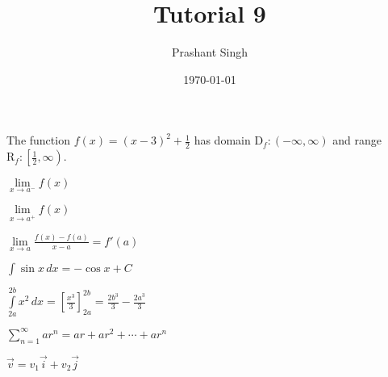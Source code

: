 \documentclass[12pt]{article}
\begin{document}
	\title{Tutorial 9}
	\author{Prashant Singh}
	\date{\today}
	\maketitle
	
The function $f(x) = (x-3)^2 + \frac{1}{2}$ has domain  $\mathrm{D}_f:(-\infty, \infty)$ and range $\mathrm{R}_f:\left[\frac{1}{2}, \infty \right)$.

$\lim \limits_{x \to a^-} f(x)$

$\lim \limits_{x \to a^+} f(x)$

$\displaystyle{\lim \limits_{x \to a}\frac{f(x) -f(a)}{x - a} = f'(a)}$

$\displaystyle{\int \sin x \, dx = - \cos x + C}$

$\displaystyle{\int \limits_{2a}^{2b} x^2 \, dx = \left[\frac{x^3}{3} \right]_{2a}^{2b} = \frac{{2b}^3}{3}} - \frac{{2a}^3}{3}$

$\displaystyle{\sum \limits_{n=1}^{\infty} ar^n = ar + ar^2 + \cdots + ar^n}$

$\vec{v} = v_1 \vec{i} + v_2 \vec{j}$
\end{document}
